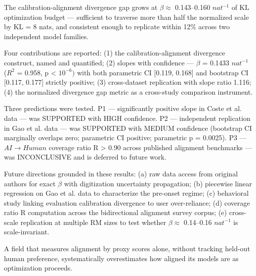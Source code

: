 
The calibration-alignment divergence gap grows at $\beta \approx$ 0.143--0.160 $nat^{-1}$ of KL optimization budget --- sufficient to traverse more than half the normalized scale by KL = 8 nats, and consistent enough to replicate within 12\% across two independent model families.

Four contributions are reported: (1) the calibration-alignment divergence construct, named and quantified; (2) slopes with confidence --- $\beta$ = 0.1433 $nat^{-1}$ ($R^2$ = 0.958, p < $10^{-6})$ with both parametric CI [0.119, 0.168] and bootstrap CI [0.117, 0.177] strictly positive; (3) cross-dataset replication with slope ratio 1.116; (4) the normalized divergence gap metric as a cross-study comparison instrument.

Three predictions were tested. P1 --- significantly positive slope in Coste et al. data --- was SUPPORTED with HIGH confidence. P2 --- independent replication in Gao et al. data --- was SUPPORTED with MEDIUM confidence (bootstrap CI marginally overlaps zero; parametric CI positive; parametric p = 0.0025). P3 --- $AI\rightarrow Human$ coverage ratio R > 0.90 across published alignment benchmarks --- was INCONCLUSIVE and is deferred to future work.

Future directions grounded in these results: (a) raw data access from original authors for exact $\beta$ with digitization uncertainty propagation; (b) piecewise linear regression on Gao et al. data to characterize the pre-onset regime; (c) behavioral study linking evaluation calibration divergence to user over-reliance; (d) coverage ratio R computation across the bidirectional alignment survey corpus; (e) cross-scale replication at multiple RM sizes to test whether $\beta \approx$ 0.14--0.16 $nat^{-1}$ is scale-invariant.

A field that measures alignment by proxy scores alone, without tracking held-out human preference, systematically overestimates how aligned its models are as optimization proceeds.


